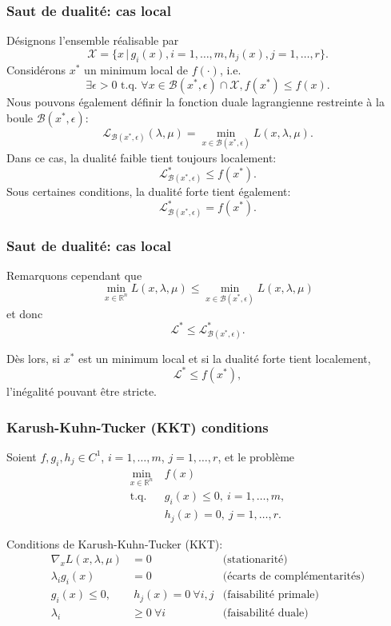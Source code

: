 \documentclass[usepdftitle=false]{beamer}
\def\cB{\mathcal{B}}
\def\cL{\mathcal{L}}
\def\cX{\mathcal{X}}
\begin{document}
\begin{frame}
\frametitle{Saut de dualité: cas local}

Désignons l'ensemble réalisable par
$$
\cX = \{ x \,|\, g_i(x), i = 1,\ldots,m, h_j(x), j = 1,\ldots,r \}.
$$
Considérons $x^*$ un minimum local de $f(\cdot)$, i.e.
$$
\exists \epsilon > 0  \text{ t.q. } \forall x \in \cB(x^*, \epsilon) \cap \cX, f(x^*) \leq f(x).
$$
Nous pouvons également définir la fonction duale lagrangienne restreinte à la boule $\cB(x^*, \epsilon)$:
$$
\cL_{\cB(x^*, \epsilon)}(\lambda, \mu) = \min_{x \in \cB(x^*, \epsilon)} L(x,\lambda, \mu).
$$
Dans ce cas, la dualité faible tient toujours localement:
$$
\cL^*_{\cB(x^*, \epsilon)} \leq f(x^*).
$$
Sous certaines conditions, la dualité forte tient également:
$$
\cL^*_{\cB(x^*, \epsilon)} = f(x^*).
$$

\end{frame}

\begin{frame}
\frametitle{Saut de dualité: cas local}

Remarquons cependant que
$$
\min_{x \in \mathbb{R}^n} L(x, \lambda, \mu) 
\leq \min_{x \in \cB(x^*, \epsilon)} L(x, \lambda, \mu) 
$$
et donc
$$
\cL^* \leq \cL^*_{\cB(x^*, \epsilon)}.
$$

\mbox{}

Dès lors, si $x^*$ est un minimum local et si la dualité forte tient localement,
$$
\cL^* \leq f(x^*),
$$
l'inégalité pouvant être stricte.

\end{frame}

\begin{frame}
	\frametitle{Karush-Kuhn-Tucker (KKT) conditions}
	
	Soient $f, g_i, h_j \in C^1$, $i = 1,\ldots,m$, $j = 1,\ldots,r$, et le problème
	\begin{align*}
		\min_{x \in \mathbb{R}^n} \ & f(x) \\
		\mbox{t.q. } & g_i(x) \leq 0,\ i = 1,\ldots,m, \\
		& h_j(x) = 0,\ j = 1,\ldots,r.
	\end{align*}
	
	Conditions de Karush-Kuhn-Tucker (KKT):
	\begin{align*}
		\nabla_x L(x,\lambda,\mu) &= 0 & \mbox{(stationarité)}\\
		\lambda_i g_i(x) &= 0 & \mbox{(écarts de complémentarités)} \\
		g_i(x) \leq 0, &\ h_j(x) = 0\ \forall i,j & \mbox{(faisabilité primale)} \\
		\lambda_i &\geq 0\ \forall i & \mbox{(faisabilité duale)}
	\end{align*}
	
\end{frame}
\end{document}
